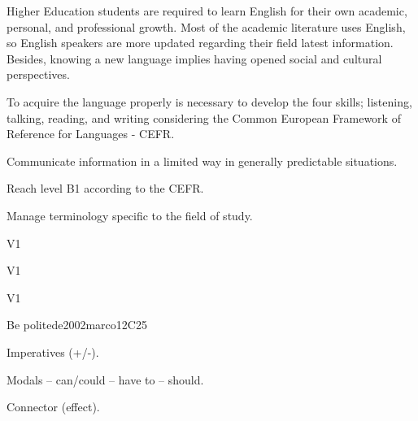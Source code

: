 \begin{syllabus}


\begin{justification}
Higher Education students are required to learn English for their own academic, 
personal, and professional growth. Most of the academic literature uses English, 
so English speakers are more updated regarding their field latest information. 
Besides, knowing a new language implies having opened social and 
cultural perspectives.  

To acquire the language properly is necessary to develop the four skills;
listening, talking, reading, and writing considering the 
Common European Framework of Reference for Languages - CEFR.
\end{justification}

\begin{goals}
\item Communicate information in a limited way in generally predictable situations.
\item Reach level B1 according to the CEFR.
\item Manage terminology specific to the field of study.
\end{goals}

\begin{outcomes}{V1}
\item {}
\end{outcomes}

\begin{competences}{V1}
\item {}
\end{competences}

\begin{specificoutcomes}{V1}
\item {}
\item {}
\item {}
\item {}
\end{specificoutcomes}

\begin{unit}{Be polite}{}{de2002marco}{12}{C25}
   \begin{topics}
      \item Imperatives (+/-).
      \item Modals – can/could – have to – should.
      \item Connector (effect).
   \end{topics}


\end{unit}
\end{syllabus}
